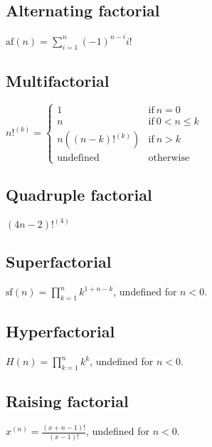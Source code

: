 \subsection{Alternating factorial}
\label{sec:Alternating factorial}

\( \displaystyle{
    \mbox{af}(n) = \sum_{i = 1}^n {(-1)^{n - i} i!}
}\)


\subsection{Multifactorial}
\label{sec:Multifactorial}

\( \displaystyle{
    n!^{(k)} = \left \lbrace \begin{array}{ll}
      1 & \textrm{if}~ n = 0 \\
      n & \textrm{if}~ 0 < n \le k \\
      n((n - k)!^{(k)}) & \textrm{if}~ n > k \\
      \textrm{undefined} & \textrm{otherwise}
    \end{array} \right .
}\)


\subsection{Quadruple factorial}
\label{sec:Quadruple factorial}

\( \displaystyle{
    (4n - 2)!^{(4)}
}\)


\subsection{Superfactorial}
\label{sec:Superfactorial}

\( \displaystyle{
    \mbox{sf}(n) = \prod_{k = 1}^n k^{1 + n - k}
}\), undefined for $n < 0$.


\subsection{Hyperfactorial}
\label{sec:Hyperfactorial}

\( \displaystyle{
    H(n) = \prod_{k = 1}^n k^k
}\), undefined for $n < 0$.


\subsection{Raising factorial}
\label{sec:Raising factorial}

\( \displaystyle{
    x^{(n)} = \frac{(x + n - 1)!}{(x - 1)!}
}\), undefined for $n < 0$.


